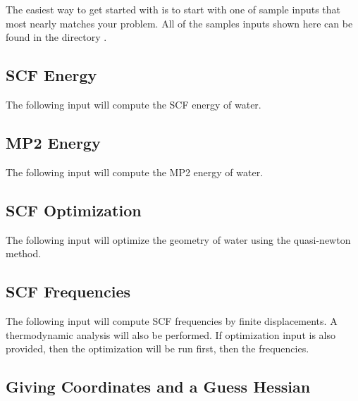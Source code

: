 The easiest way to get started with  is to start with
one of sample inputs that most nearly matches your problem.  All
of the samples inputs shown here can be found in the directory
.

\subsection{SCF Energy}

The following input will compute the SCF energy of water.



\subsection{MP2 Energy}

The following input will compute the MP2 energy of water.



\subsection{SCF Optimization}

The following input will optimize the geometry of water using
the quasi-newton method.



\subsection{SCF Frequencies}

The following input will compute SCF frequencies by finite
displacements.  A thermodynamic analysis will also be
performed.  If optimization input is also provided, then the
optimization will be run first, then the frequencies.



\subsection{Giving Coordinates and a Guess Hessian}

